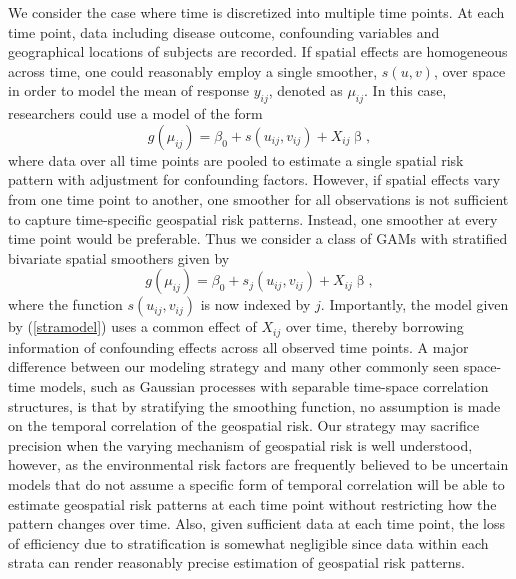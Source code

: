	We consider the case where time is discretized into multiple time points. At each time point, data including disease outcome, confounding variables and geographical locations of subjects are recorded. If spatial effects are homogeneous across time, one could reasonably employ a single smoother, $s(u,v)$, over space in order to model the mean of response $y_{ij}$, denoted as $\mu_{ij}$. In this case, researchers could use a model of the form
	\begin{equation} \label{mod:orig}
	g(\mu_{ij}) =\beta_0+s(u_{ij},v_{ij})+X_{ij}\upbeta,
	\end{equation}
	where data over all time points are pooled to estimate a single spatial risk pattern with adjustment for confounding factors. However, if spatial effects vary from one time point to another, one smoother for all observations is not sufficient to capture time-specific geospatial risk patterns. Instead, one smoother at every time point would be preferable. Thus we consider a class of GAMs with stratified bivariate spatial smoothers given by 
	\begin{equation} \label{stramodel}
	g(\mu_{ij}) = \beta_0+s_j(u_{ij},v_{ij}) +X_{ij}\upbeta,
	\end{equation}
	where the function $s(u_{ij},v_{ij})$ is now indexed by $j$. Importantly, the model given by (\ref{stramodel}) uses a common effect of $X_{ij}$ over time, thereby  borrowing information of confounding effects across all observed time points. A major difference between our modeling strategy and many other commonly seen space-time models, such as Gaussian processes with separable time-space correlation structures, is that by stratifying the smoothing function, no assumption is made on the temporal correlation of the geospatial risk. Our strategy may sacrifice precision when the varying mechanism of geospatial risk is well understood, however, as the environmental risk factors are frequently believed to be uncertain models that do not assume a specific form of temporal correlation will be able to estimate geospatial risk patterns at each time point without restricting how the pattern changes over time. Also, given sufficient data at each time point, the loss of efficiency due to stratification is somewhat negligible since data within each strata can render reasonably precise estimation of geospatial risk patterns. 
	
